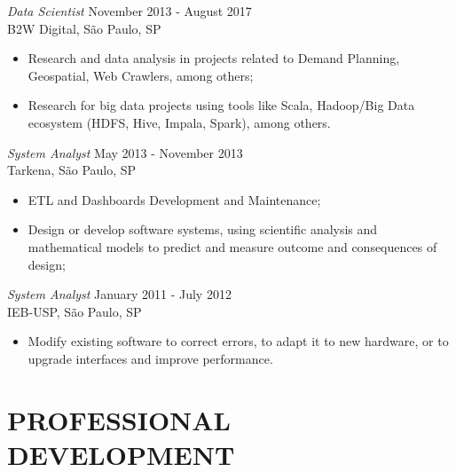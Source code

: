 \documentclass[margin, 10pt]{res} %
\begin{document}
\begin{resume}
{\sl Data Scientist} \hfill November 2013 - August 2017 \\
B2W Digital, São Paulo, SP
\begin{itemize} \itemsep -2pt %
\item Research and data analysis in projects related to Demand Planning, Geospatial, Web Crawlers, among others;
\item Research for big data projects using tools like Scala, Hadoop/Big Data ecosystem (HDFS, Hive, Impala, Spark), among others.
\end{itemize}

{\sl System Analyst} \hfill May 2013 - November 2013 \\
Tarkena, São Paulo, SP
\begin{itemize} \itemsep -2pt %
\item ETL and Dashboards Development and Maintenance;
\item Design or develop software systems, using scientific analysis and mathematical models to predict and measure outcome and consequences of design;
\end{itemize}

{\sl System Analyst} \hfill January 2011 - July 2012 \\
IEB-USP, São Paulo, SP
\begin{itemize} \itemsep -2pt %
\item Modify existing software to correct errors, to adapt it to new hardware, or to upgrade interfaces and improve performance.
\end{itemize} 




\section{PROFESSIONAL \\ DEVELOPMENT} 


\end{resume}
\end{document}
